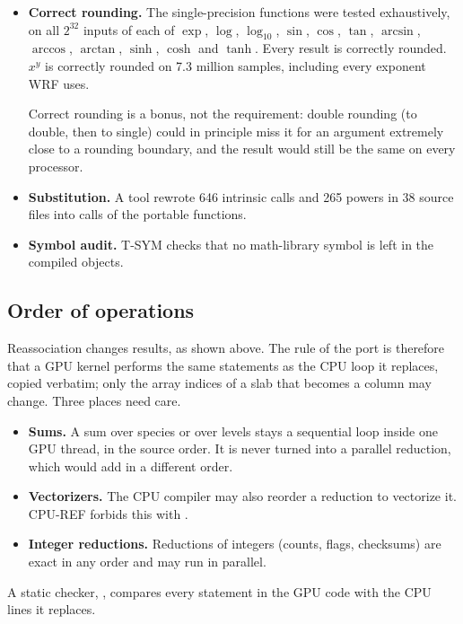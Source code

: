 \begin{portnote}
\begin{itemize}
  \item \textbf{Correct rounding.} The single-precision functions were tested exhaustively, on all $2^{32}$ inputs
    of each of $\exp$, $\log$, $\log_{10}$, $\sin$, $\cos$, $\tan$, $\arcsin$, $\arccos$, $\arctan$, $\sinh$, $\cosh$
    and $\tanh$. Every result is correctly rounded. $x^y$ is correctly rounded on 7.3 million samples, including
    every exponent WRF uses.

    Correct rounding is a bonus, not the requirement: double rounding (to double, then to single) could in principle
    miss it for an argument extremely close to a rounding boundary, and the result would still be the same on every
    processor.
  \item \textbf{Substitution.} A tool rewrote 646 intrinsic calls and 265 powers in 38 source files into calls of
    the portable functions.
  \item \textbf{Symbol audit.} T-SYM checks that no math-library symbol is left in the compiled objects.
\end{itemize}
\end{portnote}

\subsection{Order of operations}

Reassociation changes results, as shown above. The rule of the port is therefore that a GPU kernel performs the
same statements as the CPU loop it replaces, copied verbatim; only the array indices of a slab that becomes a column
may change. Three places need care.
\begin{itemize}
  \item \textbf{Sums.} A sum over species or over levels stays a sequential loop inside one GPU thread, in the
    source order. It is never turned into a parallel reduction, which would add in a different order.
  \item \textbf{Vectorizers.} The CPU compiler may also reorder a reduction to vectorize it. CPU-REF forbids this
    with .
  \item \textbf{Integer reductions.} Reductions of integers (counts, flags, checksums) are exact in any order and
    may run in parallel.
\end{itemize}
A static checker, , compares every statement in the GPU code with the CPU lines it replaces.

